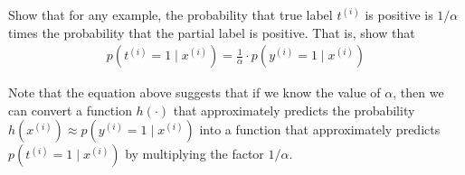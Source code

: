\item {}
Show that for any example, the probability that true label $t^{(i)}$ is positive is $1/\alpha$ times  the probability that the partial label is positive. 
That is, show that
\begin{align}p(t^{(i)} = 1\mid x^{(i)}) = \frac{1}{\alpha}\cdot p(y^{(i)} = 1\mid x^{(i)})\label{eqn:3} \end{align}

Note that the equation above suggests that if we know the value of $\alpha$, then we can convert a function $h(\cdot)$ that approximately predicts the probability $h(x^{(i)}) \approx p(y^{(i)}=1\mid x^{(i)})$ into a function that approximately predicts $p(t^{(i)} = 1\mid x^{(i)}) $ by multiplying the factor $1/\alpha$. 



